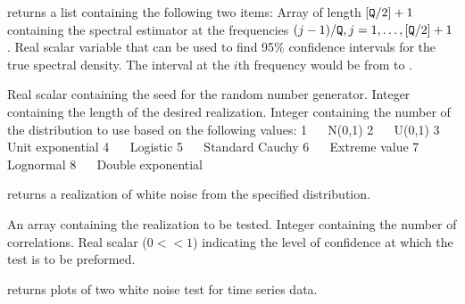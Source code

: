 \Sval
\Sitem{ }  returns a list containing the following 
two items:
 Array of length $[{\tt{Q}}/2]+1$ containing the spectral 
estimator at the frequencies $(j-1)/{\tt{Q}},j=1,\ldots,[{\tt{Q}}/2]+1$.
 Real scalar variable that can be used to find 95\% confidence 
intervals for the true spectral density.  The interval at the $i$th 
frequency would be from {} to {}.
%
%


\Sarg
{} Real scalar containing the seed for the random number generator.
 Integer containing the length of the desired realization.
 Integer containing the number of the distribution to use based
on the following values:
\Sitem{ }1 ~~ N(0,1)
\Sitem{ }2 ~~ U(0,1)
\Sitem{ }3 ~~ Unit exponential
\Sitem{ }4 ~~ Logistic
\Sitem{ }5 ~~ Standard Cauchy
\Sitem{ }6 ~~ Extreme value
\Sitem{ }7 ~~ Lognormal
\Sitem{ }8 ~~ Double exponential

\Sval
\Sitem{ }  returns a realization of white noise from the specified
distribution.
%
%


\Sarg
{} An array containing the realization to be tested.
 Integer containing the number of correlations.
 Real scalar ($0<${}$<1$) indicating the 
level of confidence at which the test is to be preformed.

\Sval
\Sitem{ }  returns plots of two white noise test for time series
data.

\vfil\eject


\def\crlne{\cr\noalign{\vskip 2mm\hrule\vskip 2mm}}


